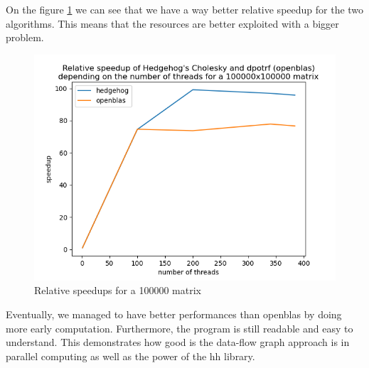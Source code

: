 On the figure \ref{fig:relativespeedup100000} we can see that we have a way
better relative speedup for the two algorithms. This means that the resources
are better exploited with a bigger problem.

\begin{figure}[!ht]
  \begin{center}
    \includegraphics[scale=0.8]{img/relative-speedup-100000.png}
    \caption{Relative speedups for a 100000 matrix}
    \label{fig:relativespeedup100000}
  \end{center}
\end{figure}

Eventually, we managed to have better performances than openblas by doing more
early computation. Furthermore, the program is still readable and easy to
understand. This demonstrates how good is the data-flow graph approach is in
parallel computing as well as the power of the \gls{hh} library.
